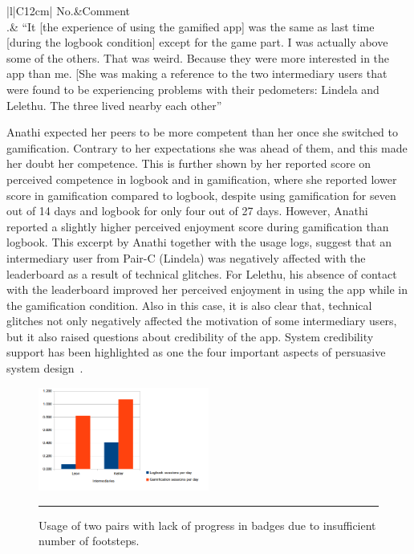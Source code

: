 \begin{table}[h!]
\renewcommand{\baselinestretch}{1.5}
  \begin{center}
    \caption{Excerpt: an example of how technical glitches reduced the credibility of the app.}
    \label{table:credibility}
	\begin{tabular}{|l|C{12cm}|}
		\hline
		No.&Comment\\
		.& {``It [the experience of using the gamified app] was the same as last time [during the logbook condition] except for the game part. I was actually above some of the others. That was weird. Because they were more interested in the app than me. [She was making a reference to the two intermediary users that were found to be experiencing problems with their pedometers: Lindela and Lelethu. The three lived nearby each other''} \\
		\hline
	\end{tabular}
  \end{center}
\end{table}     

Anathi expected her peers to be more competent than her once she switched to gamification. Contrary to her expectations she was ahead of them, and this made her doubt her competence. This is further shown by her reported score on perceived competence in logbook and in gamification, where she reported lower score in gamification compared to logbook, despite using gamification for seven out of 14 days and logbook for only four out of 27 days. However, Anathi reported a slightly higher perceived enjoyment score  during gamification than logbook. This excerpt by Anathi together with the usage logs, suggest that an intermediary user from Pair-C (Lindela) was negatively affected with the leaderboard as a result of technical glitches. For Lelethu, his absence of contact with the leaderboard improved her perceived enjoyment in using the app while in the gamification condition. Also in this case, it is also clear that, technical glitches not only negatively affected the motivation of some intermediary users, but it also raised questions about credibility of the app. System credibility support has been highlighted as one the four important aspects of persuasive system design~\citep{Oinas-kukkonen:psd}. 

\begin{figure}[htbp]
  \centering
    \includegraphics[width=0.5\textwidth]{Figures/badgesfailures2.png}
    \rule{35em}{0.5pt}
  \caption{Usage of two pairs with lack of progress in badges due to insufficient number of footsteps.}
  \label{figure:badge_failure_2}
\end{figure} 

